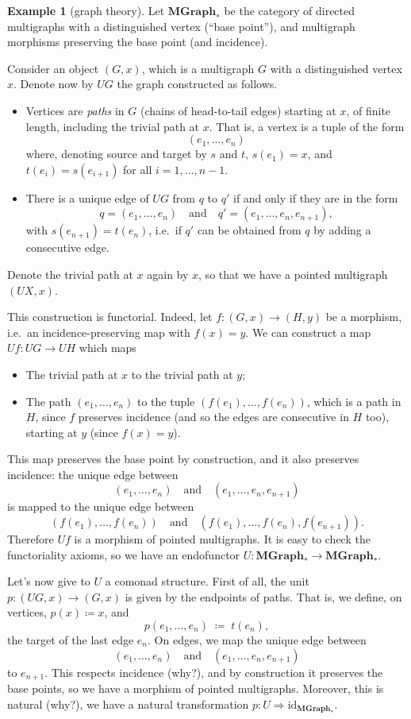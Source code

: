 \documentclass[12pt,oneside]{scrbook}
\numberwithin{equation}{section}
\theoremstyle{plain}
\theoremstyle{definition}
\newtheorem{eg}[thm]{Example}
\newcommand{\cat}[1]{{\mathbf{#1}}} %
\DeclareMathOperator{\1}{\mathbbm{1}}
\DeclareMathOperator{\2}{\mathbbm{2}}
\newcommand{\id}{\mathrm{id}} %
\begin{document}
\begin{eg}[graph theory]\label{ucgraphs}
 Let $\cat{MGraph}_*$ be the category of directed multigraphs with a distinguished vertex (``base point''), and multigraph morphisms preserving the base point (and incidence). 
 
 Consider an object $(G,x)$, which is a multigraph $G$ with a distinguished vertex $x$. Denote now by $UG$ the graph constructed as follows.
 \begin{itemize}
  \item Vertices are \emph{paths} in $G$ (chains of head-to-tail edges) starting at $x$, of finite length, including the trivial path at $x$. That is, a vertex is a tuple of the form
  $$
  (e_1,\dots,e_n)
  $$
  where, denoting source and target by $s$ and $t$, $s(e_1)=x$, and $t(e_i)=s(e_{i+1})$ for all $i=1,\dots,n-1$.
  \item There is a unique edge of $UG$ from $q$ to $q'$ if and only if they are in the form 
  $$
  q=(e_1,\dots,e_n) \quad\mbox{and}\quad q'=(e_1,\dots,e_n,e_{n+1}) ,
  $$
  with $s(e_{n+1})=t(e_n)$,
  i.e.~if $q'$ can be obtained from $q$ by adding a consecutive edge. 
 \end{itemize}
 Denote the trivial path at $x$ again by $x$, so that we have a pointed multigraph $(UX,x)$. 
 
 This construction is functorial. Indeed, let $f:(G,x)\to (H,y)$ be a morphism, i.e.~an incidence-preserving map with $f(x)=y$. We can construct a map $Uf:UG\to UH$ which maps 
 \begin{itemize}
  \item The trivial path at $x$ to the trivial path at $y$;
  \item The path $(e_1,\dots,e_n)$ to the tuple $(f(e_1),\dots,f(e_n))$, which is a path in $H$, since $f$ preserves incidence (and so the edges are consecutive in $H$ too), starting at $y$ (since $f(x)=y$). 
 \end{itemize}
 This map preserves the base point by construction, and it also preserves incidence: the unique edge between
 $$
 (e_1,\dots,e_n) \quad\mbox{and}\quad (e_1,\dots,e_n,e_{n+1})
 $$
 is mapped to the unique edge between
 $$
 (f(e_1),\dots,f(e_n)) \quad\mbox{and}\quad (f(e_1),\dots,f(e_n),f(e_{n+1})) .
 $$
 Therefore $Uf$ is a morphism of pointed multigraphs.
 It is easy to check the functoriality axioms, so we have an endofunctor $U:\cat{MGraph}_*\to\cat{MGraph}_*$. 

 Let's now give to $U$ a comonad structure. First of all, the unit $p:(UG,x)\to(G,x)$ is given by the endpoints of paths. That is, we define, on vertices, $p(x)\coloneqq x$, and
 $$
 p(e_1,\dots,e_n) \;\coloneqq\; t(e_n),
 $$
 the target of the last edge $e_n$. On edges, we map the unique edge between
 $$
 (e_1,\dots,e_n) \quad\mbox{and}\quad (e_1,\dots,e_n,e_{n+1})
 $$
 to $e_{n+1}$. This respects incidence (why?), and by construction it preserves the base points, so we have a morphism of pointed multigraphs. Moreover, this is natural (why?), we have a natural transformation $p:U\Rightarrow \id_{\cat{MGraph}_*}$. 
 

\end{eg}
\end{document}
